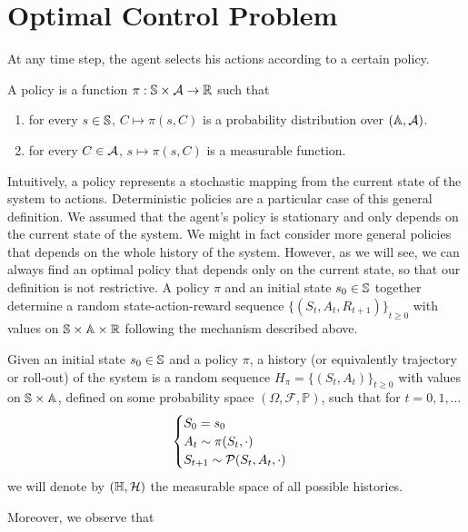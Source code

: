 \section{Optimal Control Problem}
At any time step, the agent selects his actions according to a certain policy. 
\begin{definition}[Policy]
	A policy is a function $\pi: \S \times \calA \to \R$ such that
	\begin{enumerate}[label={\roman*)}]
		\item for every $s \in \S$, $C \mapsto \pi(s,C)$ is a probability
			  distribution over $(\A, \calA)$. 
		\item for every $C \in \calA$, $s \mapsto \pi(s, C)$ is a measurable
			  function. 
	\end{enumerate}
\end{definition}
Intuitively, a policy represents a stochastic mapping from the current state of
the system to actions. Deterministic policies are a particular case of this 
general definition. We assumed that the agent's policy is stationary and only
depends on the current state of the system. We might in fact  consider more 
general policies that depends on the whole history of the system. However, as
we will see, we can always find an optimal policy that depends only on the
current state, so that our definition is not restrictive. A policy $\pi$ and an
initial state $s_0 \in \S$ together determine a random state-action-reward 
sequence ${\{(S_t, A_t, R_{t+1})\}}_{t\geq 0}$ with values on $\S \times \A
\times \R$ following the mechanism described above. 
\begin{definition}[History]
	Given an initial state $s_0 \in \S$ and a policy $\pi$, a history (or
	equivalently trajectory or roll-out) of the system is a random sequence
	$H_\pi = {\{(S_t, A_t)\}}_{t\geq 0}$ with values on $\S \times \A$, defined
	on some probability space $(\Omega, \mathcal{F}, \mathbb{P})$, such that for 
	$t = 0, 1, \ldots$
	\begin{equation}
		\begin{cases}
			S_0 = s_0\\
			A_t \sim \pi(S_t, \cdot)\\
			S_{t+1} \sim \calP(S_t, A_t, \cdot)\\
		\end{cases}
	\end{equation}
	we will denote by $(\H, \calH)$ the measurable space of all possible
	histories. 
\end{definition}
Moreover, we observe that
